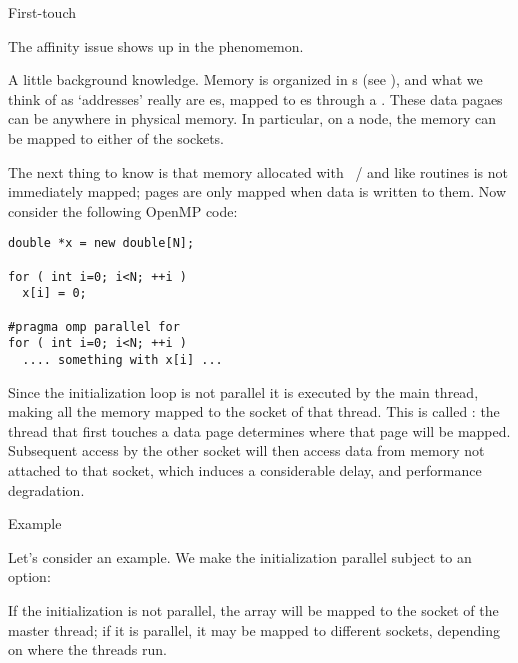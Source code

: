 
 {First-touch}
\label{sec:first-touch}

The affinity issue shows up in the 
phenomemon.


A little background knowledge. Memory is organized in
s
(see ),
and what we think of as `addresses' really are
es,
mapped to es
through a .
These data pagaes can be anywhere in physical memory.
In particular, on a  node,
the memory can be mapped to either of the sockets.

The next thing to know is that
memory allocated with ~/ 
and like routines
is not immediately mapped;
pages are only mapped when data is written to them.
Now consider the following OpenMP code:
\begin{lstlisting}[language=omp]
double *x = new double[N];

for ( int i=0; i<N; ++i )
  x[i] = 0;

#pragma omp parallel for
for ( int i=0; i<N; ++i )
  .... something with x[i] ...
\end{lstlisting}
Since the initialization loop is not parallel it is executed by the
main thread, making all the memory mapped to the socket of
that thread.
This is called :
the thread that first touches a data page determines where
that page will be mapped.
Subsequent access by the other socket will then access
data from memory not attached to that socket,
which induces a considerable delay, and performance degradation.

 {Example}

Let's consider an example. We make the initialization
parallel subject to an option:
%
\begin{packt}
\end{packt}
\begin{nopackt}
\end{nopackt}

If the initialization is not parallel, the array will be mapped
to the socket of the master thread; if it is parallel,
it may be mapped to different sockets, depending on where the threads run.

